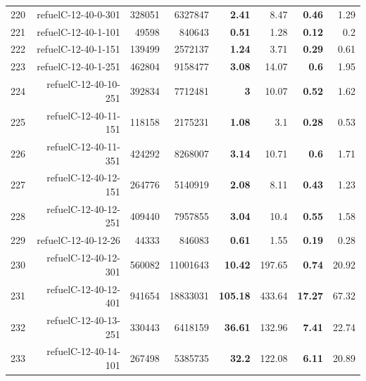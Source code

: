 \begin{longtable}{lrr@{\hskip 12pt}r@{\hskip 12pt}r@{\hskip 12pt}r@{\hskip 12pt}r@{\hskip 12pt}r}
220 & \multirow{1}{*}{refuelC-12-40-0-301} & \multirow{1}{*}{328051} & \multirow{1}{*}{6327847} & \textbf{2.41} & 8.47 & \textbf{0.46} & 1.29 \\
221 & \multirow{1}{*}{refuelC-12-40-1-101} & \multirow{1}{*}{49598} & \multirow{1}{*}{840643} & \textbf{0.51} & 1.28 & \textbf{0.12} & 0.2 \\
222 & \multirow{1}{*}{refuelC-12-40-1-151} & \multirow{1}{*}{139499} & \multirow{1}{*}{2572137} & \textbf{1.24} & 3.71 & \textbf{0.29} & 0.61 \\
223 & \multirow{1}{*}{refuelC-12-40-1-251} & \multirow{1}{*}{462804} & \multirow{1}{*}{9158477} & \textbf{3.08} & 14.07 & \textbf{0.6} & 1.95 \\
224 & \multirow{1}{*}{refuelC-12-40-10-251} & \multirow{1}{*}{392834} & \multirow{1}{*}{7712481} & \textbf{3} & 10.07 & \textbf{0.52} & 1.62 \\
225 & \multirow{1}{*}{refuelC-12-40-11-151} & \multirow{1}{*}{118158} & \multirow{1}{*}{2175231} & \textbf{1.08} & 3.1 & \textbf{0.28} & 0.53 \\
226 & \multirow{1}{*}{refuelC-12-40-11-351} & \multirow{1}{*}{424292} & \multirow{1}{*}{8268007} & \textbf{3.14} & 10.71 & \textbf{0.6} & 1.71 \\
227 & \multirow{1}{*}{refuelC-12-40-12-151} & \multirow{1}{*}{264776} & \multirow{1}{*}{5140919} & \textbf{2.08} & 8.11 & \textbf{0.43} & 1.23 \\
228 & \multirow{1}{*}{refuelC-12-40-12-251} & \multirow{1}{*}{409440} & \multirow{1}{*}{7957855} & \textbf{3.04} & 10.4 & \textbf{0.55} & 1.58 \\
229 & \multirow{1}{*}{refuelC-12-40-12-26} & \multirow{1}{*}{44333} & \multirow{1}{*}{846083} & \textbf{0.61} & 1.55 & \textbf{0.19} & 0.28 \\
230 & \multirow{1}{*}{refuelC-12-40-12-301} & \multirow{1}{*}{560082} & \multirow{1}{*}{11001643} & \textbf{10.42} & 197.65 & \textbf{0.74} & 20.92 \\
231 & \multirow{1}{*}{refuelC-12-40-12-401} & \multirow{1}{*}{941654} & \multirow{1}{*}{18833031} & \textbf{105.18} & 433.64 & \textbf{17.27} & 67.32 \\
232 & \multirow{1}{*}{refuelC-12-40-13-251} & \multirow{1}{*}{330443} & \multirow{1}{*}{6418159} & \textbf{36.61} & 132.96 & \textbf{7.41} & 22.74 \\
233 & \multirow{1}{*}{refuelC-12-40-14-101} & \multirow{1}{*}{267498} & \multirow{1}{*}{5385735} & \textbf{32.2} & 122.08 & \textbf{6.11} & 20.89 \\

\end{longtable}
